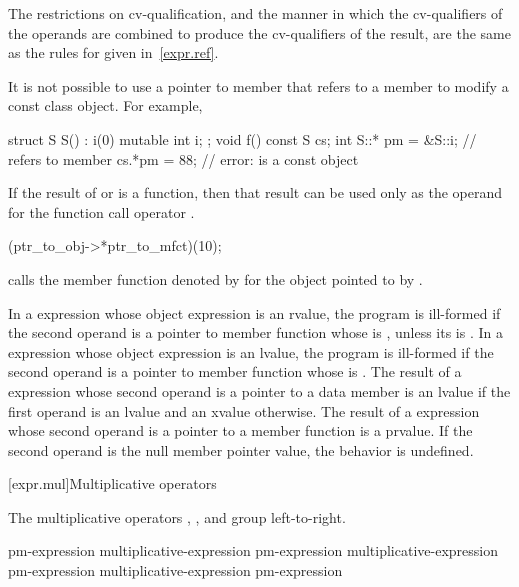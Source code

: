 \pnum
The restrictions on cv-qualification, and the manner in which
the cv-qualifiers of the operands are combined to produce the
cv-qualifiers of the result, are the same as the rules for
 given in~\ref{expr.ref}.
\begin{note}
It is not possible to use a pointer to member that refers to a
 member to modify a const class object. For
example,
\begin{codeblock}
struct S {
  S() : i(0) { }
  mutable int i;
};
void f()
{
  const S cs;
  int S::* pm = &S::i;          //  refers to  member 
  cs.*pm = 88;                  // error:  is a const object
}
\end{codeblock}
\end{note}

\pnum
{}%
If the result of  or \tcode{->*} is a function, then that
result can be used only as the operand for the function call operator
\tcode{()}.
\begin{example}
\begin{codeblock}
(ptr_to_obj->*ptr_to_mfct)(10);
\end{codeblock}
calls the member function denoted by  for the object
pointed to by .
\end{example}
In a  expression whose object expression is an rvalue, the program is
ill-formed if the second operand is a pointer to member function
whose  is \tcode{\&},
unless its  is .
In a 
expression whose object expression is an lvalue, the program is ill-formed if the second
operand is
a pointer to member function
whose  is \tcode{\&\&}.
The result of a  expression
whose second operand is a pointer to a data member is an lvalue if the first
operand is an lvalue and an xvalue otherwise. The result of a  expression whose
second operand is a pointer to a member function is a prvalue.
If the second operand is the null
member pointer value, the behavior is undefined.

[expr.mul]{Multiplicative operators}%
%

\pnum
The multiplicative operators \tcode{*}, \tcode{/}, and \tcode{\%} group
left-to-right.

%
%
%
%
%
%
%
%
\begin{bnf}
\br
    pm-expression\br
    multiplicative-expression \terminal{*} pm-expression\br
    multiplicative-expression \terminal{/} pm-expression\br
    multiplicative-expression \terminal{\%} pm-expression
\end{bnf}

